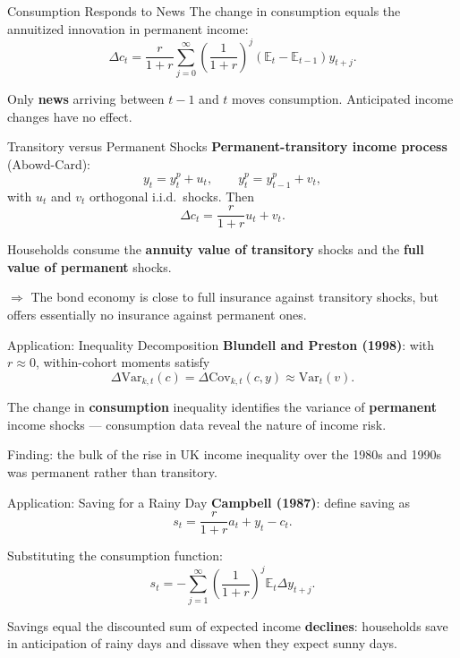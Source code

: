 \documentclass[blue]{beamer}
\newcommand{\E}{\mathbb{E}}
\begin{document}
	\begin{frame}{Consumption Responds to News}
		The change in consumption equals the annuitized innovation in permanent income:
		\[
		\Delta c_t = \frac{r}{1+r} \sum_{j=0}^{\infty}\left(\frac{1}{1+r}\right)^j (\E_t - \E_{t-1}) y_{t+j}.
		\]
		
		Only \textbf{news} arriving between $t-1$ and $t$ moves consumption. Anticipated income changes have no effect.
	\end{frame}
	
	\begin{frame}{Transitory versus Permanent Shocks}
		\textbf{Permanent-transitory income process} (Abowd-Card):
		\[
		y_t = y_t^p + u_t, \qquad y_t^p = y_{t-1}^p + v_t,
		\]
		with $u_t$ and $v_t$ orthogonal i.i.d.\ shocks. Then
		\[
		\Delta c_t = \frac{r}{1+r} u_t + v_t.
		\]
		
		\bigskip
		Households consume the \textbf{annuity value of transitory} shocks and the \textbf{full value of permanent} shocks.
		
		\bigskip
		$\Rightarrow$ The bond economy is close to full insurance against transitory shocks, but offers essentially no insurance against permanent ones.
	\end{frame}
	
	\begin{frame}{Application: Inequality Decomposition}
		\textbf{Blundell and Preston (1998)}: with $r \approx 0$, within-cohort moments satisfy
		\[
		\Delta \text{Var}_{k,t}(c) = \Delta \text{Cov}_{k,t}(c, y) \approx \text{Var}_t(v).
		\]
		
		\bigskip
		The change in \textbf{consumption} inequality identifies the variance of \textbf{permanent} income shocks --- consumption data reveal the nature of income risk.
		
		\bigskip
		Finding: the bulk of the rise in UK income inequality over the 1980s and 1990s was permanent rather than transitory.
	\end{frame}
	
	\begin{frame}{Application: Saving for a Rainy Day}
		\textbf{Campbell (1987)}: define saving as
		\[
		s_t = \frac{r}{1+r}a_t + y_t - c_t.
		\]
		
		Substituting the consumption function:
		\[
		s_t = -\sum_{j=1}^{\infty}\left(\frac{1}{1+r}\right)^j \E_t \Delta y_{t+j}.
		\]
		
		\bigskip
		Savings equal the discounted sum of expected income \textbf{declines}: households save in anticipation of rainy days and dissave when they expect sunny days.
	\end{frame}
	
\end{document}
